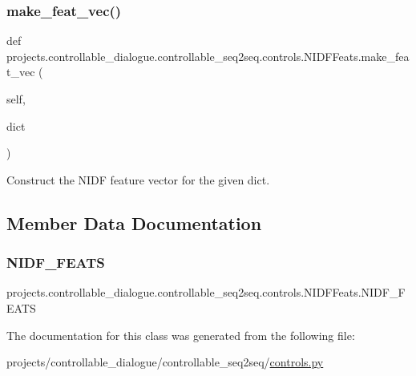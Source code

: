 \subsubsection{\texorpdfstring{make\+\_\+feat\+\_\+vec()}{make\_feat\_vec()}}
{\footnotesize\ttfamily def projects.\+controllable\+\_\+dialogue.\+controllable\+\_\+seq2seq.\+controls.\+N\+I\+D\+F\+Feats.\+make\+\_\+feat\+\_\+vec (\begin{DoxyParamCaption}\item[{}]{self,  }\item[{}]{dict }\end{DoxyParamCaption})}

\begin{DoxyVerb}Construct the NIDF feature vector for the given dict.
\end{DoxyVerb}
 

\subsection{Member Data Documentation}
\mbox{\label{classprojects_1_1controllable__dialogue_1_1controllable__seq2seq_1_1controls_1_1NIDFFeats_a6717e3ef6420caafd4eb177c07e007fe}} 
\subsubsection{\texorpdfstring{N\+I\+D\+F\+\_\+\+F\+E\+A\+TS}{NIDF\_FEATS}}
{\footnotesize\ttfamily projects.\+controllable\+\_\+dialogue.\+controllable\+\_\+seq2seq.\+controls.\+N\+I\+D\+F\+Feats.\+N\+I\+D\+F\+\_\+\+F\+E\+A\+TS}



The documentation for this class was generated from the following file\+:\begin{DoxyCompactItemize}
\item 
projects/controllable\+\_\+dialogue/controllable\+\_\+seq2seq/\hyperlink{controls_8py}{controls.\+py}\end{DoxyCompactItemize}

